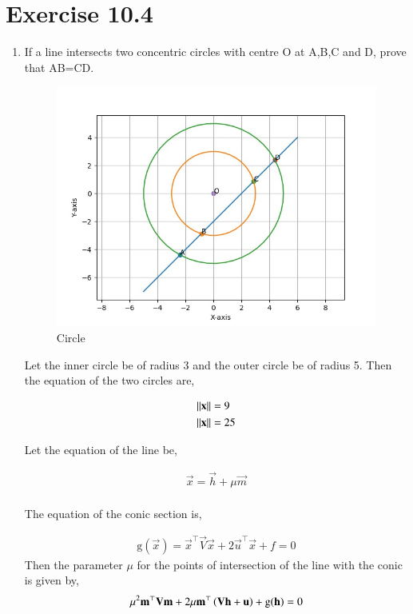 \documentclass[journal,12pt,twocolumn]{IEEEtran}
\begin{document}
\section{Exercise 10.4}
\begin{enumerate}
	\item If a line intersects two concentric circles with centre O at A,B,C and D, prove that AB=CD.

\begin{figure}[ht]
	\centering
	\includegraphics[width = \columnwidth]{figs/plot.jpg}
	\caption{Circle}
	\label{fig:1}
\end{figure}

Let the inner circle be of radius 3 and the outer circle be of radius 5. Then the equation of the two circles are,

		\begin{align}
			\left\lVert\mathbf{x}\right\rVert &= 9\\
			\left\lVert\mathbf{x}\right\rVert &= 25
		\end{align}

Let the equation of the line be,

		\begin{align}
			\vec{x} = \vec{h} +\mu \vec{m}\\
		\end{align}

The equation of the conic section is,

		\begin{align}
			\text{g}(\vec{x}) = \vec{x}^{\top}\vec{V}\vec{x} +2\vec{u}^{\top}\vec{x} + f=0
		\end{align}
Then the parameter $\mu$ for the points of intersection of the line with the conic is given by,
		\begin{align}
			\mu^2\mathbf{m}^{\top}\mathbf{V}\mathbf{m}+2\mu\mathbf{m}^{\top}\left(\mathbf{V}\mathbf{h}+\mathbf{u}\right) +\text{g}(\mathbf{h}) = 0
		\end{align}


\end{enumerate}
\end{document}

